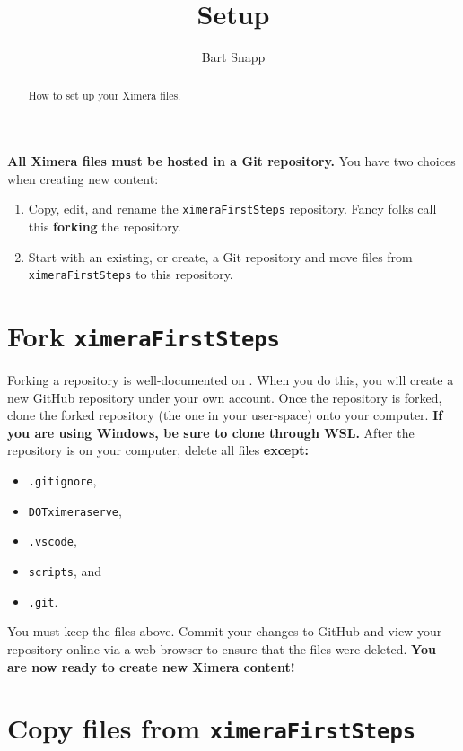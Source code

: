 \documentclass{ximera}
\title{Setup}
\author{Bart Snapp}
\begin{document}
\begin{abstract}
  How to set up your Ximera files.
\end{abstract}
\maketitle

\textbf{All Ximera files must be hosted in a Git repository.} You have two
choices when creating new content:
\begin{enumerate}
  \item Copy, edit, and rename the \texttt{ximeraFirstSteps} repository.
        Fancy folks call this \textbf{forking} the repository.
  \item Start with an existing, or create, a Git repository and move files
        from \texttt{ximeraFirstSteps} to this repository.
\end{enumerate}

\section{Fork \texttt{ximeraFirstSteps}}

Forking a repository is well-documented on
.
When you do this, you will create a new GitHub repository under your own
account.
Once the repository is forked, clone the forked repository (the one in your
user-space) onto your computer. \textbf{If you are using Windows, be sure to
  clone through WSL.}
After the repository is on your computer, delete all files \textbf{except:}
\begin{itemize}
  \item \verb|.gitignore|,
  \item \verb|DOTximeraserve|,
  \item \verb|.vscode|,
  \item \verb|scripts|, and
  \item \verb|.git|.
\end{itemize}
You must keep the files above.	Commit your changes to GitHub and view your
repository online via a web browser to ensure that the files were deleted. \textbf{You are now ready to create new Ximera content!}






\section{Copy files from \texttt{ximeraFirstSteps}}
\end{document}

